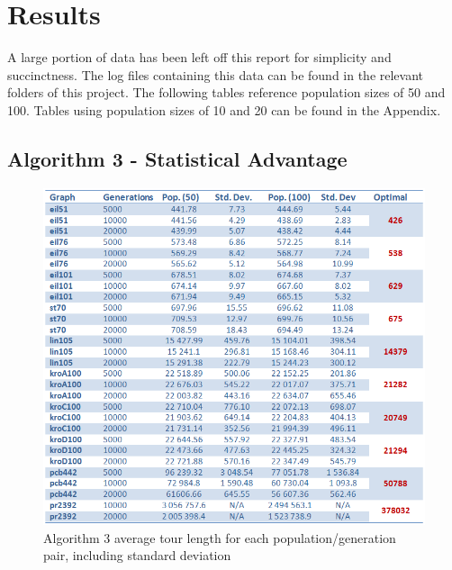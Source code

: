 \documentclass[a4paper,12pt]{article}
\begin{document}
\newpage
\section{Results}
A large portion of data has been left off this report for simplicity and succinctness. The log files containing this data can be found in the relevant folders of this project. The following tables reference population sizes of 50 and 100. Tables using population sizes of 10 and 20 can be found in the Appendix.

\subsection{Algorithm 3 - Statistical Advantage}
\begin{figure}[h]
\centering
\includegraphics[width=\linewidth]{Alg3_Pop50_100.png}
\caption{Algorithm 3 average tour length for each population/generation pair, including standard deviation}
\end{figure}

\newpage
\end{document}
